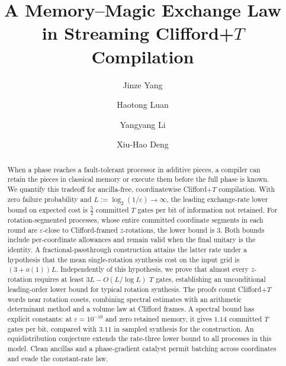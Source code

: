 \documentclass[aps,prx,twocolumn,superscriptaddress,nofootinbib,longbibliography]{revtex4-2}
\theoremstyle{plain}
\theoremstyle{definition}
\theoremstyle{remark}
\begin{document}
\title{A Memory--Magic Exchange Law in Streaming \texorpdfstring{Clifford+$T$}{Clifford+T} Compilation}

\author{Jinze Yang}

\author{Haotong Luan}

\author{Yangyang Li}

\author{Xiu-Hao Deng}

\begin{abstract}
When a phase reaches a fault-tolerant processor in additive pieces, a compiler can retain the pieces in classical memory or execute them before the full phase is known. We quantify this tradeoff for ancilla-free, coordinatewise Clifford+$T$ compilation. With zero failure probability and $L:=\log_2(1/\varepsilon)\to\infty$, the leading exchange-rate lower bound on expected cost is $\tfrac52$ committed $T$ gates per bit of information not retained. For rotation-segmented processes, whose entire committed coordinate segments in each round are $\varepsilon$-close to Clifford-framed $z$-rotations, the lower bound is $3$. Both bounds include per-coordinate allowances and remain valid when the final unitary is the identity. A fractional-passthrough construction attains the latter rate under a hypothesis that the mean single-rotation synthesis cost on the input grid is $(3+o(1))L$. Independently of this hypothesis, we prove that almost every $z$-rotation requires at least $3L-O(L/\log L)$ $T$ gates, establishing an unconditional leading-order lower bound for typical rotation synthesis. The proofs count Clifford+$T$ words near rotation cosets, combining spectral estimates with an arithmetic determinant method and a volume law at Clifford frames. A spectral bound has explicit constants: at $\varepsilon=10^{-10}$ and zero retained memory, it gives $1.14$ committed $T$ gates per bit, compared with $3.11$ in sampled synthesis for the construction. An equidistribution conjecture extends the rate-three lower bound to all processes in this model. Clean ancillas and a phase-gradient catalyst permit batching across coordinates and evade the constant-rate law.
\end{abstract}
\end{document}

